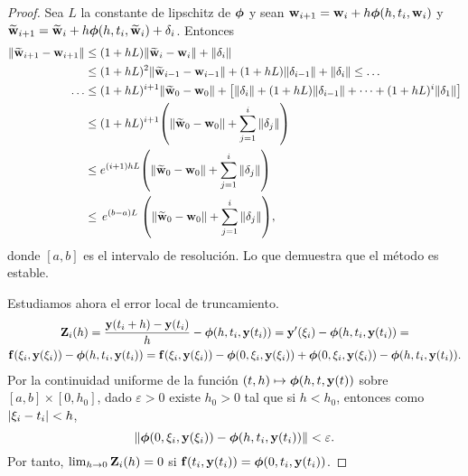 \begin{proof}
    Sea $L$ la constante de lipschitz de $\vb*{\phi}{}$ y
    sean $\vb{w}{}_{i+1} = \vb{w}{}_i + h\vb*{\phi}{}(h, t_i, \vb{w}{}_i)$ y
    $\vb{\widetilde{w}}{}_{i+1} = \vb{\widetilde{w}}{}_i + h\vb*{\phi}{}(h, t_i, \vb{\widetilde{w}}{}_i) + \delta_i$.
    Entonces
    \begin{align*}
        \norm{\vb{\widetilde{w}}{}_{i+1} - \vb{w}{}_{i+1}} & {} \le
            (1 + hL)\norm{\vb{\widetilde{w}}{}_i - \vb{w}{}_i} + \norm{\delta_i} \\
        & \le (1 + hL)^2\norm{\vb{\widetilde{w}}{}_{i-1} - \vb{w}{}_{i-1}}
            + (1 + hL)\norm{\delta_{i-1}}
            + \norm{\delta_i} \le \ldots \\
        \ldots & \le (1 + hL)^{i+1}\norm{\vb{\widetilde{w}}{}_0 - \vb{w}{}_0} + \qty[
            \norm{\delta_i} + (1 + hL)\norm{\delta_{i-1}} + \dots
            + (1 + hL)^i\norm{\delta_1}
        ] \\
        & \le (1 + hL)^{i+1}\qty(
            \norm{\vb{\widetilde{w}}{}_0 - \vb{w}{}_0} + \sum_{j=1}^i \norm{\delta_j}
        ) \\
        & \le e^{(i+1)hL}\qty(
            \norm{\vb{\widetilde{w}}{}_0 - \vb{w}{}_0} + \sum_{j=1}^i \norm{\delta_j}
        ) \\
        & \le \, e^{(b-a)L} \; \qty(
            \norm{\vb{\widetilde{w}}{}_0 - \vb{w}{}_0} + \sum_{j=1}^i \norm{\delta_j}
        ),
    \end{align*}
    donde $[a, b]$ es el intervalo de resolución.
    Lo que demuestra que el método es estable.

    Estudiamos ahora el error local de truncamiento.
    \begin{multline*}
        \vb{Z}{}_i(h) = \frac{\vb{y}{}(t_i + h) - \vb{y}{}(t_i)}{h} - \vb*{\phi}{}(h, t_i, \vb{y}{}(t_i)) =
        \vb{y}{}'(\xi_i) - \vb*{\phi}{}(h, t_i, \vb{y}{}(t_i)) = \\
        \vb{f}{}(\xi_i, \vb{y}{}(\xi_i)) - \vb*{\phi}{}(h, t_i, \vb{y}{}(t_i)) =
        \vb{f}{}(\xi_i, \vb{y}{}(\xi_i)) - \vb*{\phi}{}(0, \xi_i, \vb{y}{}(\xi_i))
            + \vb*{\phi}{}(0, \xi_i, \vb{y}{}(\xi_i)) - \vb*{\phi}{}(h, t_i, \vb{y}{}(t_i)).
    \end{multline*}
    Por la continuidad uniforme de la función
    $(t, h) \mapsto \vb*{\phi}{}(h, t, \vb{y}{}(t))$ sobre $[a, b] \times [0, h_0]$,
    dado $\varepsilon > 0$ existe $h_0 > 0$ tal que si $h < h_0$,
    entonces como $\abs{\xi_i - t_i} < h$,
    \begin{equation*}
        \norm{\vb*{\phi}{}(0, \xi_i, \vb{y}{}(\xi_i)) - \vb*{\phi}{}(h, t_i, \vb{y}{}(t_i))} <
        \varepsilon.
    \end{equation*}
    Por tanto, $\lim_{h \to 0} \vb{Z}{}_i(h) = 0$
    si $\vb{f}{}(t_i, \vb{y}{}(t_i)) = \vb*{\phi}{}(0, t_i, \vb{y}{}(t_i))$.
\end{proof}

